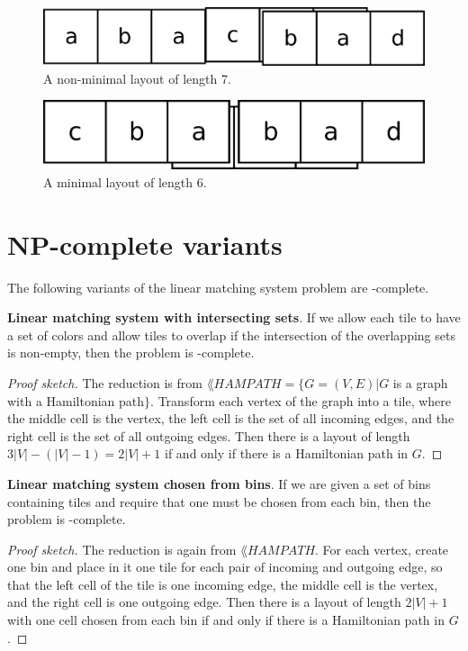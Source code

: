 \documentclass{lposter}
\theoremstyle{definition} \newtheorem*{definition}{Definition}
\begin{document}
\begin{poster}
\begin{figure}
  \caption{A non-minimal layout of length 7.}
  \includegraphics{non-minimal}
\end{figure}

\begin{figure}
  \caption{A minimal layout of length 6.}
  \includegraphics{minimal}
\end{figure}

\section{NP-complete variants}

The following variants of the linear matching system problem are
\NP-complete.

{\bf Linear matching system with intersecting sets}. If we allow each tile to
have a set of colors and allow tiles to overlap if the intersection of the
overlapping sets is non-empty, then the problem is \NP-complete.

\begin{proof}[Proof sketch]
  The reduction is from $\lang{HAMPATH} = \{G=(V, E)|G$ is a graph with a
  Hamiltonian path$\}$. Transform each vertex of the graph into a tile, where
  the middle cell is the vertex, the left cell is the set of all incoming
  edges, and the right cell is the set of all outgoing edges. Then there is a
  layout of length $3|V| - (|V| - 1) = 2|V| + 1$ if and only if there is a
  Hamiltonian path in $G$.
\end{proof}

{\bf Linear matching system chosen from bins}. If we are given a set of bins
containing tiles and require that one must be chosen from each bin, then the
problem is \NP-complete.

\begin{proof}[Proof sketch]
  The reduction is again from $\lang{HAMPATH}$. For each vertex, create one bin
  and place in it one tile for each pair of incoming and outgoing edge, so that
  the left cell of the tile is one incoming edge, the middle cell is the
  vertex, and the right cell is one outgoing edge. Then there is a layout of
  length $2|V| + 1$ with one cell chosen from each bin if and only if there is
  a Hamiltonian path in $G$.
\end{proof}


\end{poster}
\end{document}

